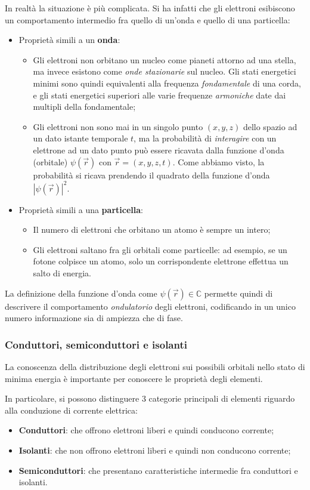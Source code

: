 \documentclass[a4paper,11pt]{article}
\begin{document}
In realtà la situazione è più complicata. Si ha infatti che gli elettroni esibiscono un comportamento intermedio fra quello di un'onda e quello di una particella:
\begin{itemize}
	\item Proprietà simili a un \textbf{onda}:
	\begin{itemize}
		\item Gli elettroni non orbitano un nucleo come pianeti attorno ad una stella, ma invece esistono come \textit{onde stazionarie} sul nucleo. Gli stati energetici minimi sono quindi equivalenti alla frequenza \textit{fondamentale} di una corda, e gli stati energetici superiori alle varie frequenze \textit{armoniche} date dai multipli della fondamentale;
		\item Gli elettroni non sono mai in un singolo punto $(x, y, z)$ dello spazio ad un dato istante temporale $t$, ma la probabilità di \textit{interagire} con un elettrone ad un dato punto può essere ricavata dalla funzione d'onda (orbitale) $\psi(\vec{r})$ con $\vec{r} = (x, y, z, t)$. Come abbiamo visto, la probabilità si ricava prendendo il quadrato della funzione d'onda $|\psi(\vec{r})|^2$. 
	\end{itemize}
	\item Proprietà simili a una \textbf{particella}:
	\begin{itemize}
		\item Il numero di elettroni che orbitano un atomo è sempre un intero;
		\item Gli elettroni saltano fra gli orbitali come particelle: ad esempio, se un fotone colpisce un atomo, solo un corrispondente elettrone effettua un salto di energia.
	\end{itemize}
\end{itemize}

La definizione della funzione d'onda come $\psi(\vec{r}) \in \mathbb{C}$ permette quindi di descrivere il comportamento \textit{ondulatorio} degli elettroni, codificando in un unico numero informazione sia di ampiezza che di fase.

\subsubsection{Conduttori, semiconduttori e isolanti}
La conoscenza della distribuzione degli elettroni sui possibili orbitali nello stato di minima energia è importante per conoscere le proprietà degli elementi.

In particolare, si possono distinguere 3 categorie principali di elementi riguardo alla conduzione di corrente elettrica:
\begin{itemize}
	\item \textbf{Conduttori}: che offrono elettroni liberi e quindi conducono corrente;
	\item \textbf{Isolanti}: che non offrono elettroni liberi e quindi non conducono corrente;
	\item \textbf{Semiconduttori}: che presentano caratteristiche intermedie fra conduttori e isolanti.
\end{itemize}
\end{document}
